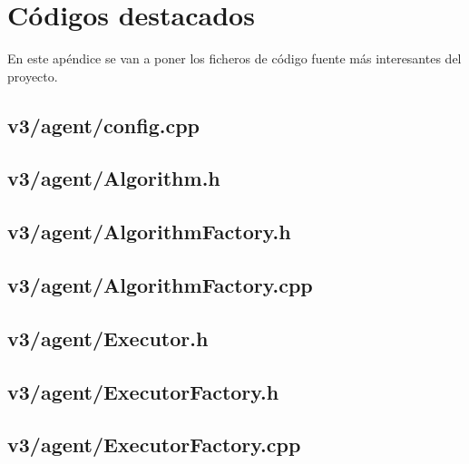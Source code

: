 \chapter{Códigos destacados} 

En este apéndice se van a poner los ficheros de código fuente más interesantes del proyecto.

\section{v3/agent/config.cpp}



\section{v3/agent/Algorithm.h}



\section{v3/agent/AlgorithmFactory.h}



\section{v3/agent/AlgorithmFactory.cpp}



\section{v3/agent/Executor.h}



\section{v3/agent/ExecutorFactory.h}



\section{v3/agent/ExecutorFactory.cpp}

